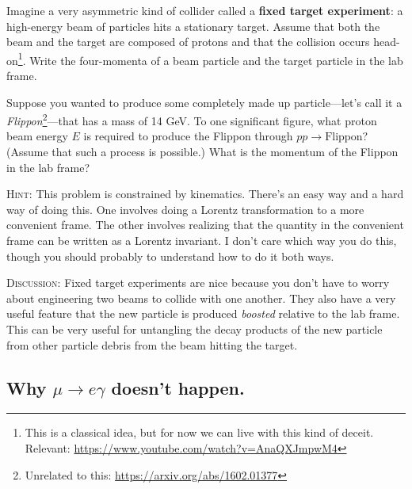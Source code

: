 \documentclass[12pt]{article}
\numberwithin{equation}{section}    %
\begin{document}
Imagine a very asymmetric kind of collider called a \textbf{fixed target experiment}: a high-energy beam of particles hits a stationary target. Assume that both the beam and the target are composed of protons and that the collision occurs head-on\footnote{This is a classical idea, but for now we can live with this kind of deceit. Relevant: \url{https://www.youtube.com/watch?v=AnaQXJmpwM4}}. Write the four-momenta of a beam particle and the target particle in the lab frame. 

Suppose you wanted to produce some completely made up particle---let's call it a \emph{Flippon}\footnote{Unrelated to this: \url{https://arxiv.org/abs/1602.01377}}---that has a mass of 14 GeV. To one significant figure, what proton beam energy $E$ is required to produce the Flippon through $pp \to \text{Flippon}$? (Assume that such a process is possible.) What is the momentum of the Flippon in the lab frame?

\textsc{Hint}: This problem is constrained by kinematics. There's an easy way and a hard way of doing this. One involves doing a Lorentz transformation to a more convenient frame. The other involves realizing that the quantity in the convenient frame can be written as a Lorentz invariant. I don't care which way you do this, though you should probably to understand how to do it both ways. 

\textsc{Discussion}: Fixed target experiments are nice because you don't have to worry about engineering two beams to collide with one another. They also have a very useful feature that the new particle is produced \emph{boosted} relative to the lab frame. This can be very useful for untangling the decay products of the new particle from other  particle debris from the beam hitting the target.


%
%





\subsection{Why $\mu \to e \gamma$ doesn't happen.}
\end{document}
